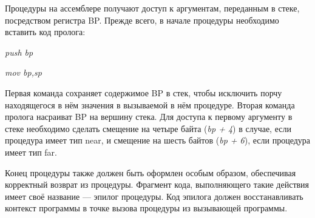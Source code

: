 Процедуры на ассемблере получают доступ к аргументам, переданным в стеке,
посредством регистра BP. Прежде всего, в начале процедуры необходимо вставить
код пролога:

\textit{push bp}

\textit{mov bp,sp}

Первая команда сохраняет содержимое BP в стек, чтобы исключить порчу находящегося
в нём значения в вызываемой в нём процедуре. Вторая команда пролога насраиват BP
на вершину стека. Для доступа к первому аргументу в стеке необходимо
сделать смещение на четыре байта (\textit{bp + 4}) в случае, если процедура имеет тип near,
и смещение на шесть байтов (\textit{bp + 6}), если процедура имеет тип far.

Конец процедуры также должен быть оформлен особым образом, обеспечивая корректный
возврат из процедуры. Фрагмент кода, выполняющего такие действия имеет своё
название --- эпилог процедуры. Код эпилога должен восстанавливать контекст программы
в точке вызова процедуры из вызывающей программы.

\pagebreak

